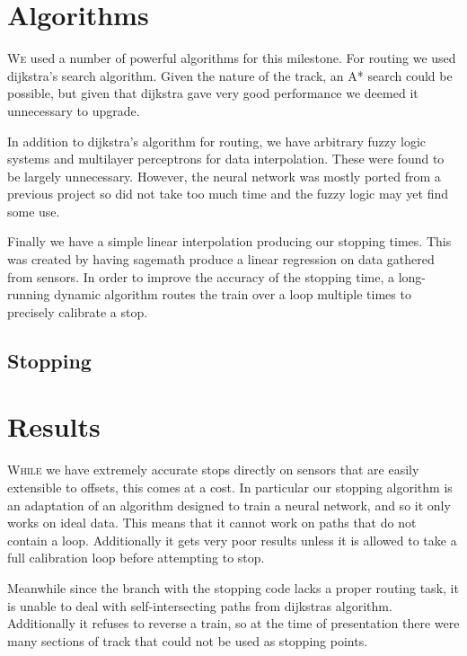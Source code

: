 \documentclass{article}
\begin{document}
\section*{Algorithms}

\textsc{We} used a number of powerful algorithms for this milestone. For routing
we used dijkstra's search algorithm. Given the nature of the track, an A* search
could be possible, but given that dijkstra gave very good performance we deemed
it unnecessary to upgrade.

In addition to dijkstra's algorithm for routing, we have arbitrary fuzzy logic
systems and multilayer perceptrons for data interpolation. These were found to
be largely unnecessary. However, the neural network was mostly ported from a
previous project so did not take too much time and the fuzzy logic may yet find
some use.

Finally we have a simple linear interpolation producing our stopping times. This
was created by having sagemath produce a linear regression on data gathered from
sensors. In order to improve the accuracy of the stopping time, a long-running
dynamic algorithm routes the train over a loop multiple times to precisely
calibrate a stop.

\subsection*{Stopping}


\section*{Results}

\textsc{While} we have extremely accurate stops directly on sensors that are easily
extensible to offsets, this comes at a cost. In particular our stopping
algorithm is an adaptation of an algorithm designed to train a neural network,
and so it only works on ideal data. This means that it cannot work on paths that
do not contain a loop. Additionally it gets very poor results unless it is
allowed to take a full calibration loop before attempting to stop.

Meanwhile since the branch with the stopping code lacks a proper routing task,
it is unable to deal with self-intersecting paths from dijkstras algorithm.
Additionally it refuses to reverse a train, so at the time of presentation there
were many sections of track that could not be used as stopping points.
\end{document}
